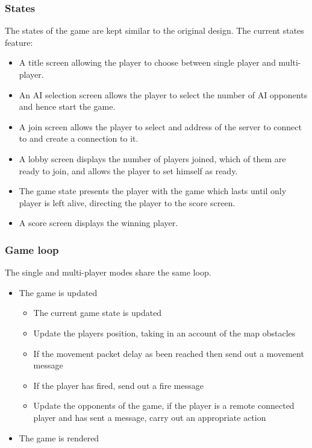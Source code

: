 \documentclass[11pt]{article} %
\begin{document}
\subsubsection*{States}

The states of the game are kept similar to the original design. The current states feature:

\begin{itemize}
\item A title screen allowing the player to choose between single player and multi-player.
\item An AI selection screen allows the player to select the number of AI opponents and hence start the game.
\item	A join screen allows the player to select and address of the server to connect to and create a connection to it.
\item A lobby screen displays the number of players joined, which of them are ready to join, and allows the player to set himself as ready.
\item The game state presents the player with the game which lasts until only player is left alive, directing the player to the score screen.
\item A score screen displays the winning player.

\end{itemize}

\subsubsection*{Game loop}

The single and multi-player modes share the same loop. 

\begin{itemize}
\item The game is updated \begin{itemize}
	\item The current game state is updated
	\item Update the players position, taking in an account of the map obstacles 
	\item If the movement packet delay as been reached then send out a movement message
	\item If the player has fired, send out a fire message
	\item Update the opponents of the game, if the player is a remote connected player and has sent a message, carry out an appropriate action
	\end{itemize}
\item The game is rendered
\end{itemize}
\end{document}
